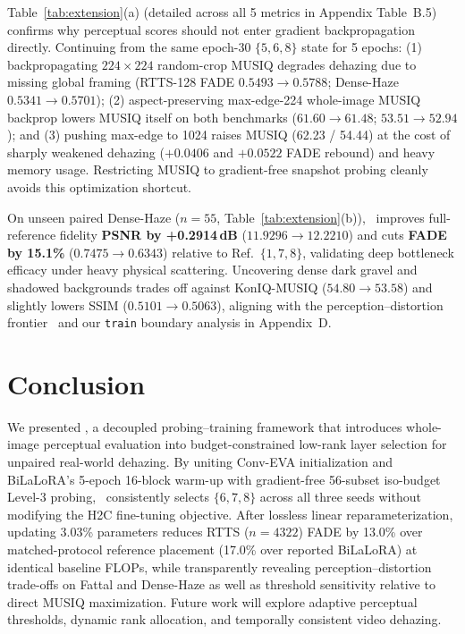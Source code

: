 \documentclass[10pt,twocolumn,letterpaper]{article}
\begin{document}
Table~\ref{tab:extension}(a) (detailed across all 5 metrics in Appendix Table~B.5) confirms why perceptual scores should not enter gradient backpropagation directly. Continuing from the same epoch-30 $\{5,6,8\}$ state for 5 epochs: (1) backpropagating $224\times 224$ random-crop MUSIQ degrades dehazing due to missing global framing (RTTS-128 FADE $0.5493 \to 0.5788$; Dense-Haze $0.5341 \to 0.5701$); (2) aspect-preserving max-edge-224 whole-image MUSIQ backprop lowers MUSIQ itself on both benchmarks ($61.60 \to 61.48$; $53.51 \to 52.94$); and (3) pushing max-edge to 1024 raises MUSIQ (62.23 / 54.44) at the cost of sharply weakened dehazing ($+0.0406$ and $+0.0522$ FADE rebound) and heavy memory usage. Restricting MUSIQ to gradient-free snapshot probing cleanly avoids this optimization shortcut.

On unseen paired Dense-Haze ($n=55$, Table~\ref{tab:extension}(b)), \method~improves full-reference fidelity \textbf{PSNR by +0.2914\,dB} ($11.9296 \to 12.2210$) and cuts \textbf{FADE by 15.1\%} ($0.7475 \to 0.6343$) relative to Ref.~\(\{1,7,8\}\), validating deep bottleneck efficacy under heavy physical scattering. Uncovering dense dark gravel and shadowed backgrounds trades off against KonIQ-MUSIQ ($54.80 \to 53.58$) and slightly lowers SSIM ($0.5101 \to 0.5063$), aligning with the perception--distortion frontier~\cite{perception2018} and our \texttt{train} boundary analysis in Appendix~D.

\section{Conclusion}
We presented \method, a decoupled probing--training framework that introduces whole-image perceptual evaluation into budget-constrained low-rank layer selection for unpaired real-world dehazing. By uniting Conv-EVA initialization and BiLaLoRA's 5-epoch 16-block warm-up with gradient-free 56-subset iso-budget Level-3 probing, \method~consistently selects $\{6,7,8\}$ across all three seeds without modifying the H2C fine-tuning objective. After lossless linear reparameterization, updating 3.03\% parameters reduces RTTS ($n=4322$) FADE by 13.0\% over matched-protocol reference placement (17.0\% over reported BiLaLoRA) at identical baseline FLOPs, while transparently revealing perception--distortion trade-offs on Fattal and Dense-Haze as well as threshold sensitivity relative to direct MUSIQ maximization. Future work will explore adaptive perceptual thresholds, dynamic rank allocation, and temporally consistent video dehazing.
\end{document}
